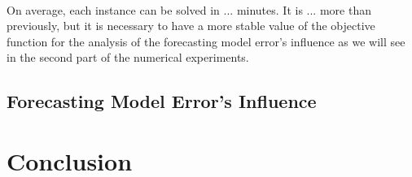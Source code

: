 \documentclass[12pt,a4paper]{article}
\begin{document}
\paragraph{}
On average, each instance can be solved in ... minutes. It is ... more than previously, but it is necessary to have a more stable value of the objective function for the analysis of the forecasting model error's influence as we will see in the second part of the numerical experiments.

\subsection{Forecasting Model Error's Influence}
\paragraph{}

\section{Conclusion}


\end{document}

